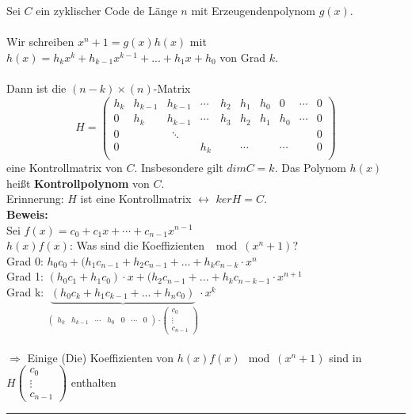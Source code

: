 \documentclass[9pt]{article}
\begin{document}
\begin{satz}
Sei $C$ ein zyklischer Code de Länge $n$ mit Erzeugendenpolynom $g(x)$. \\ 
 \\
Wir schreiben $x^n+1 = g(x)h(x)$ mit $h(x) = h_kx^k + h_{k-1}x^{k-1}+...+h_1x+h_0$ von Grad $k$. \\
\\
Dann ist die $(n-k)\times(n)$-Matrix
\[
H = 
\begin{pmatrix}
h_k & h_{k-1} & h_{k-1} & \cdots & h_2 & h_1 & h_0 & 0 & \cdots & 0 \\
0 & h_k & h_{k-1} & \cdots & h_3 & h_2 & h_1 & h_0 &  \cdots & 0 \\
0 &  & \ \ \ddots  & & & & & & &  0 \\
0  & &  & h_k & &  \cdots & & \cdots & & 0\\
\end{pmatrix}
\]
eine Kontrollmatrix von $C$. Insbesondere gilt $dim C = k$. Das Polynom $h(x)$ heißt \textbf{Kontrollpolynom} von $C.$ \\ \newline 
Erinnerung: $H$ ist eine Kontrollmatrix $\leftrightarrow$ $ker H = C$. \\ 
\textbf{Beweis:} \\
Sei $f(x) = c_0 + c_1x + \cdots + c_{n-1} x^{n-1}$ \\
$h(x)f(x)$: Was sind die Koeffizienten $\mod (x^n+1)$? \\
Grad 0: $h_0c_0 + (h_1c_{n-1} + h_2c_{n-1}+...+h_kc_{n-k}  \cdot x^n $\\
Grad 1: $(h_0c_1 + h_1c_{0})\cdot x + ( h_2c_{n-1}+...+h_kc_{n-k-1} \cdot x^{n+1}$  \\
Grad k: $\underbrace{(h_0c_k + h_1c_{k-1} + ... + h_nc_0) }_{
\begin{pmatrix}
h_k & h_{k-1} & \cdots & h_0 & 0 & \cdots & 0
\end{pmatrix} \cdot
\begin{pmatrix}
c_0 \\ \vdots \\ c_{n-1}
\end{pmatrix}
}\cdot x^k$ \\
\\ \newline
$\Rightarrow$ Einige (Die) Koeffizienten von $h(x)f(x) \mod (x^n+1)$ sind in $H \begin{pmatrix}
c_0 \\ \vdots \\ c_{n-1}
\end{pmatrix}$ enthalten 
 \end{satz} \noindent \rule{8cm}{0.4pt}
\end{document}

